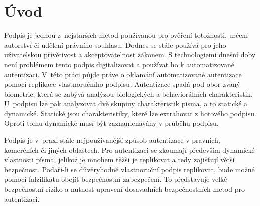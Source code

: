 
%

\chapter{Úvod}
Podpis je jednou z~nejstarších metod používanou pro ověření totožnosti, určení autorství či udělení právního souhlasu.
Dodnes se stále používá pro jeho uživatelskou přívětivost a akceptovatelnost zákonem. %
S technologiemi dnešní doby není problémem tento podpis digitalizovat a používat ho k automatizované autentizaci. %
V~této práci půjde práve o oklamání automatizované autentizace pomocí replikace vlastnoručního podpisu.
Autentizace spadá pod obor zvaný biometrie, která se zabývá analýzou biologických a behaviorálních charakteristik. 
U~podpisu lze pak analyzovat dvě skupiny charakteristik písma, a to statické a dynamické. 
Statické jsou charakteristiky, které lze extrahovat z hotového podpisu.
Oproti tomu dynamické musí být zaznamenávány v průběhu podpisu.

Podpis je v~praxi stále nejpoužívanější způsob autentizace v pravních, komerčních či jiných oblastech. 
Pro autentizaci se zkoumají především dynamické vlastnosti písma, jelikož je mnohem těžší je replikovat a tedy zajišťují větší bezpečnost.
Podaří-li se důvěryhodně vlastnoruční podpis replikovat, bude možné pomocí falzifikátu obejít bezpečnostní zabezpečení. 
To představuje velké bezpečnostní riziko a nutnost upravení dosavadních bezpečnostních metod pro autentizaci. 



